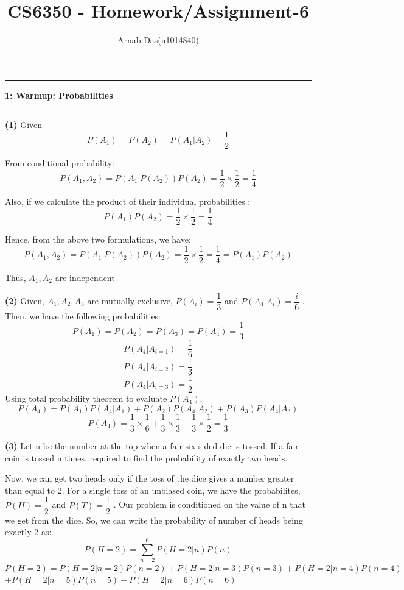 \documentclass{article}
\title{CS6350 - Homework/Assignment-6}
\author{Arnab Das(u1014840)}
\newcommand\question[2]{\vspace{.25in}\hrule\textbf{#1: #2}\hrule\vspace{.10in}}
\renewcommand\part[1]{\vspace{.10in}\textbf{(#1)}}
\begin{document}
  \maketitle
  \newpage
  \newcommand\NAME{ARNAB DAS}
  \newcommand\UID{uxxxxxxx}
  \newcommand\HWNUM{4}

  \question{1}{Warmup: Probabilities}
  \part{1} Given \newline
  \[ P(A_1) = P(A_2) = P(A_1 | A_2) = \dfrac{1}{2} \]

  From conditional probability:
  \[ P(A_1 , A_2) = P(A_1 | P(A_2))P(A_2) = \dfrac{1}{2} \times \dfrac{1}{2} = \dfrac{1}{4} \]

  Also, if we calculate the product of their individual probabilities :
  \[ P(A_1)P(A_2) = \dfrac{1}{2} \times \dfrac{1}{2} = \dfrac{1}{4} \]

  Hence, from the above two formulations, we have:
  \[ P(A_1 , A_2) = P(A_1 | P(A_2))P(A_2) = \dfrac{1}{2} \times \dfrac{1}{2} = \dfrac{1}{4} = P(A_1)P(A_2)\]

  Thus, $A_1, A_2$ are independent

  \part{2} Given, $A_1,A_2,A_3$ are mutually exclusive, $P(A_i) = \dfrac{1}{3}$ and $P(A_4 | A_i) = \dfrac{i}{6}$ . Then, we have the following probabilities: \newline
  \[P(A_1) = P(A_2) = P(A_3) = P(A_4) = \dfrac{1}{3}\]
  \[P(A_4|A_{i=1}) = \dfrac{1}{6}\]
  \[P(A_4|A_{i=2}) = \dfrac{1}{3}\]
  \[P(A_4|A_{i=3}) = \dfrac{1}{2}\]
  Using total probability theorem to evaluate $P(A_4)$, 
  \[ P(A_4) = P(A_1)P(A_4|A_1) + P(A_2)P(A_4|A_2) + P(A_3)P(A_4|A_3) \]
  \[ P(A_4) = \dfrac{1}{3}\times \dfrac{1}{6} + \dfrac{1}{3} \times \dfrac{1}{3} + \dfrac{1}{3}\times \dfrac{1}{2} = \dfrac{1}{3}\]

  \part{3} 
  Let n be the number at the top when a fair six-sided die is tossed. If a fair coin is tossed n times, required to find the probability of exactly two heads. \newline

  Now, we can get two heads only if the toss of the dice gives a number greater than equal to 2. For a single toss of an unbiased coin, we have the probabilites, $P(H) = \dfrac{1}{2}$ and $P(T) = \dfrac{1}{2}$ . Our problem is conditioned on the value of n that we get from the dice. So, we can write the probability of number of heads being exactly 2 as:
  \[P(H=2) = \sum_{n=2}^6P(H=2|n)P(n) \]
  $P(H=2) = P(H=2|n=2)P(n=2) + P(H=2|n=3)P(n=3) + P(H=2|n=4)P(n=4)$ \newline $ + P(H=2|n=5)P(n=5 ) + P(H=2|n=6)P(n=6)$
\end{document}
